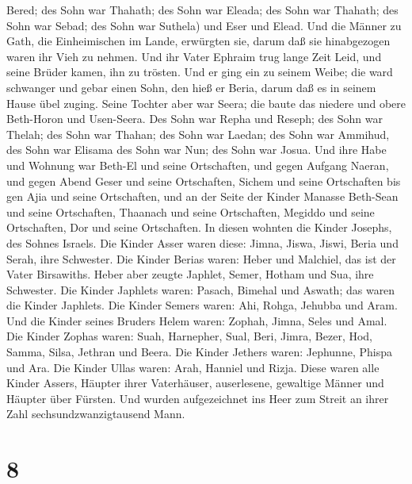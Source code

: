 Bered; des Sohn war Thahath; des Sohn war Eleada; des Sohn war Thahath;
 des Sohn war Sebad; des Sohn war Suthela) und Eser und
Elead. Und die Männer zu Gath, die Einheimischen im Lande, erwürgten
sie, darum daß sie hinabgezogen waren ihr Vieh zu nehmen. 
Und ihr Vater Ephraim trug lange Zeit Leid, und seine Brüder kamen, ihn
zu trösten.  Und er ging ein zu seinem Weibe; die ward
schwanger und gebar einen Sohn, den hieß er Beria, darum daß es in
seinem Hause übel zuging.  Seine Tochter aber war Seera;
die baute das niedere und obere Beth-Horon und Usen-Seera. 
Des Sohn war Repha und Reseph; des Sohn war Thelah; des Sohn war Thahan;
 des Sohn war Laedan; des Sohn war Ammihud, des Sohn war
Elisama  des Sohn war Nun; des Sohn war Josua.
 Und ihre Habe und Wohnung war Beth-El und seine
Ortschaften, und gegen Aufgang Naeran, und gegen Abend Geser und seine
Ortschaften, Sichem und seine Ortschaften bis gen Ajia und seine
Ortschaften,  und an der Seite der Kinder Manasse Beth-Sean
und seine Ortschaften, Thaanach und seine Ortschaften, Megiddo und seine
Ortschaften, Dor und seine Ortschaften. In diesen wohnten die Kinder
Josephs, des Sohnes Israels.  Die Kinder Asser waren diese:
Jimna, Jiswa, Jiswi, Beria und Serah, ihre Schwester.  Die
Kinder Berias waren: Heber und Malchiel, das ist der Vater Birsawiths.
 Heber aber zeugte Japhlet, Semer, Hotham und Sua, ihre
Schwester.  Die Kinder Japhlets waren: Pasach, Bimehal und
Aswath; das waren die Kinder Japhlets.  Die Kinder Semers
waren: Ahi, Rohga, Jehubba und Aram.  Und die Kinder seines
Bruders Helem waren: Zophah, Jimna, Seles und Amal.  Die
Kinder Zophas waren: Suah, Harnepher, Sual, Beri, Jimra, 
Bezer, Hod, Samma, Silsa, Jethran und Beera.  Die Kinder
Jethers waren: Jephunne, Phispa und Ara.  Die Kinder Ullas
waren: Arah, Hanniel und Rizja.  Diese waren alle Kinder
Assers, Häupter ihrer Vaterhäuser, auserlesene, gewaltige Männer und
Häupter über Fürsten. Und wurden aufgezeichnet ins Heer zum Streit an
ihrer Zahl sechsundzwanzigtausend Mann.

\hypertarget{section-7}{%
\section{8}\label{section-7}}

